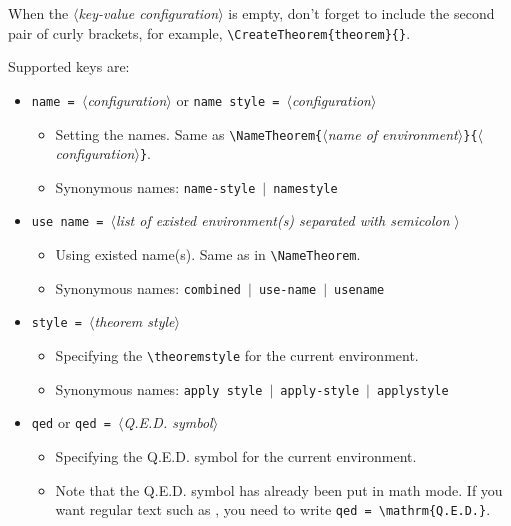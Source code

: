 \documentclass[classical]{einfart}
\newcommand{\meta}[1]{$\langle${\normalfont\itshape#1}$\rangle$}
\newcommand{\commandoption}[1]{\textcolor{code-keys}{\texttt{#1}}}
\newenvironment{tip}[1][Tip]
  {%
    \LocallyStopLineNumbers%
    \begin{tcolorbox}[breakable,
        enhanced,
        width = \textwidth,
        colback = paper, colbacktitle = paper,
        colframe = gray!50, boxrule=0.2mm,
        coltitle = black,
        fonttitle = \sffamily,
        attach boxed title to top left = {yshift=-\tcboxedtitleheight/2, xshift=.5cm},
        boxed title style = {boxrule=0pt, colframe=paper},
        before skip = 3mm,
        after skip = 3mm,
        top = 2.5mm,
        bottom = 1.5mm,
        title={\scshape\sffamily #1}]%
  }
  {%
    \end{tcolorbox}%
    \ResumeLineNumbers%
  }
\begin{document}
\begin{tip}[Attention]
    When the \meta{key-value configuration} is empty, don't forget to include the second pair of curly brackets, for example, \lstinline|\CreateTheorem{theorem}{}|.
\end{tip}

Supported keys are:
\vspace{-.2\baselineskip}
\begin{itemize}[label=,leftmargin=1.25em,itemindent=-1.25em]
    \item \commandoption{name}\lstinline| = |\meta{configuration} \quad or \quad \commandoption{name style}\lstinline| = |\meta{configuration}
        \begin{itemize}
            \item Setting the names. Same as \lstinline|\NameTheorem{|\meta{name of environment}\lstinline|}{|\meta{configuration}\lstinline|}|.
            \item Synonymous names: \commandoption{name-style} \,$|$\, \commandoption{namestyle}
        \end{itemize}
    \item \commandoption{use name}\lstinline| = |\meta{list of existed environment(s) separated with semicolon \textquote{ ; }}
        \begin{itemize}
            \item Using existed name(s). Same as in \lstinline|\NameTheorem|.
            \item Synonymous names: \commandoption{combined} \,$|$\, \commandoption{use-name} \,$|$\, \commandoption{usename}
        \end{itemize}
    \item \commandoption{style}\lstinline| = |\meta{theorem style}
        \begin{itemize}
            \item Specifying the \lstinline|\theoremstyle| for the current environment.
            \item Synonymous names: \commandoption{apply style} \,$|$\, \commandoption{apply-style} \,$|$\, \commandoption{applystyle}
        \end{itemize}
    \item \commandoption{qed} or \commandoption{qed}\lstinline| = |\meta{Q.E.D. symbol}
        \begin{itemize}
            \item Specifying the Q.E.D. symbol for the current environment.
            \item Note that the Q.E.D. symbol has already been put in math mode. If you want regular text such as , you need to write \commandoption{qed}\lstinline| = \mathrm{Q.E.D.}|.

\end{itemize}
\end{itemize}
\end{document}
